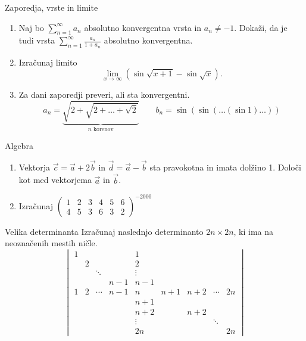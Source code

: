 \newcommand{\ZZ}{\mathbb{Z}}
\newcommand{\RR}{\mathbb{R}}
\newcommand{\CC}{\mathbb{C}}

\begin{frame}{Zaporedja, vrste in limite}
	\begin{enumerate}
		\item
		Naj bo $\sum_{n=1}^\infty a_n$ absolutno konvergentna vrsta in $a_n \ne -1$.
		Dokaži, da je tudi vrsta $\sum_{n=1}^\infty \frac{a_n}{1+a_n}$
		absolutno konvergentna.

		\item
		Izračunaj limito
		$$
		\lim_{x\rightarrow \infty} (\sin \sqrt{x+1} - \sin \sqrt{x}).
		$$

		\item
		Za dani zaporedji preveri, ali sta konvergentni.
		$$
		a_n = \underbrace{\sqrt{2+\sqrt{2+\dots+\sqrt{2}}}}_{n \text{ korenov}} \qquad b_n = \sin(\sin(\dots(\sin 1)\dots))
		$$
	\end{enumerate}
\end{frame}

\begin{frame}{Algebra}
	\begin{enumerate}
		\item
		Vektorja $\vec{c} = \vec{a} + 2\vec{b}$ in $\vec{d} = \vec{a} - \vec{b}$
		sta pravokotna in imata dolžino 1. Določi kot med vektorjema $\vec{a}$ in $\vec{b}$.
		\item 
		Izračunaj
		$\begin{pmatrix}
		1 & 2 & 3 & 4 & 5 & 6 \\
		4 & 5 & 3 & 6 & 3 & 2
		\end{pmatrix}^{-2000}$
	\end{enumerate}
\end{frame}

\begin{frame}{Velika determinanta}
	Izračunaj naslednjo determinanto $2n \times 2n$, ki ima na neoznačenih mestih ničle.
	$$\begin{vmatrix}
		1 & & & & 1 & & & & \\
		& 2 & & & 2 & & & & \\
		& & \ddots & & \vdots & & & & \\
		& & & n-1 & n-1 & & & & \\
		1 & 2 & \cdots & n-1 & n & n+1 & n+2 & \cdots & 2n \\
		& & & & n+1 & & & & \\
		& & & & n+2 & & n+2 & & \\
		& & & & \vdots & & & \ddots & \\
		& & & & 2n & & & & 2n
	\end{vmatrix}$$
\end{frame}

